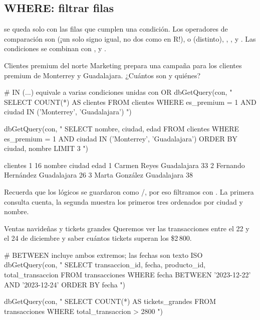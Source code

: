 \subsection{WHERE: filtrar filas}

 se queda solo con las filas que cumplen una condición. Los
operadores de comparación son \codigo{=} (¡un solo signo igual, no dos como
en R!), \codigo{<>} o \codigo{!=} (distinto), \codigo{<}, \codigo{>},
\codigo{<=} y \codigo{>=}. Las condiciones se combinan con ,
 y .

\begin{ejemplo}{Clientes premium del norte}
Marketing prepara una campaña para los clientes premium de Monterrey y
Guadalajara. ¿Cuántos son y quiénes?
\end{ejemplo}

\begin{rcode}
# IN (...) equivale a varias condiciones unidas con OR
dbGetQuery(con, "
  SELECT COUNT(*) AS clientes
  FROM clientes
  WHERE es_premium = 1
    AND ciudad IN ('Monterrey', 'Guadalajara')
")

dbGetQuery(con, "
  SELECT nombre, ciudad, edad
  FROM clientes
  WHERE es_premium = 1
    AND ciudad IN ('Monterrey', 'Guadalajara')
  ORDER BY ciudad, nombre
  LIMIT 3
")
\end{rcode}

\begin{rsalida}
  clientes
1       16
              nombre      ciudad edad
1       Carmen Reyes Guadalajara   33
2 Fernando Hernández Guadalajara   26
3     Marta González Guadalajara   38
\end{rsalida}

Recuerda que los lógicos se guardaron como /, por eso
filtramos con . La primera consulta cuenta, la
segunda muestra los primeros tres ordenados por ciudad y nombre.

\begin{ejemplo}{Ventas navideñas y tickets grandes}
Queremos ver las transacciones entre el 22 y el 24 de diciembre y saber
cuántos tickets superan los \$2\,800.
\end{ejemplo}

\begin{rcode}
# BETWEEN incluye ambos extremos; las fechas son texto ISO
dbGetQuery(con, "
  SELECT transaccion_id, fecha, producto_id, total_transaccion
  FROM transacciones
  WHERE fecha BETWEEN '2023-12-22' AND '2023-12-24'
  ORDER BY fecha
")

dbGetQuery(con, "
  SELECT COUNT(*) AS tickets_grandes
  FROM transacciones
  WHERE total_transaccion > 2800
")
\end{rcode}

